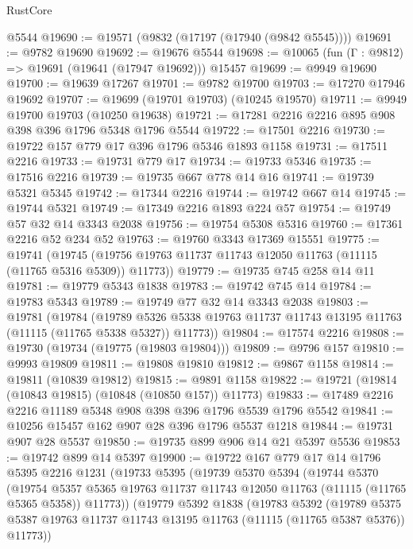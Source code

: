 \begin{lexlean}{RustCore}
\begin{coremodule}
    @5544
@19690 := @19571 (@9832 (@17197 (@17940 (@9842 @5545))))
@19691 := @9782 @19690
@19692 := @19676 @5544
@19698 := @10065 (fun (Γ : @9812) => @19691 (@19641 (@17947 @19692))) @15457
@19699 := @9949 @19690
@19700 := @19639 @17267
@19701 := @9782 @19700
@19703 := @17270 @17946 @19692
@19707 := @19699 (@19701 @19703) (@10245 @19570)
@19711 := @9949 @19700 @19703 (@10250 @19638)
@19721 := @17281 @2216 @2216 @895 @908 @398 @396 @1796 @5348 @1796 @5544
@19722 := @17501 @2216
@19730 := @19722 @157 @779 @17 @396 @1796 @5346 @1893 @1158
@19731 := @17511 @2216
@19733 := @19731 @779 @17
@19734 := @19733 @5346
@19735 := @17516 @2216
@19739 := @19735 @667 @778 @14 @16
@19741 := @19739 @5321 @5345
@19742 := @17344 @2216
@19744 := @19742 @667 @14
@19745 := @19744 @5321
@19749 := @17349 @2216 @1893 @224 @57
@19754 := @19749 @57 @32 @14 @3343 @2038
@19756 := @19754 @5308 @5316
@19760 := @17361 @2216 @52 @234 @52
@19763 := @19760 @3343 @17369 @15551
@19775 := @19741
    (@19745 (@19756 @19763 @11737 @11743 @12050 @11763 (@11115 (@11765 @5316 @5309)) @11773))
@19779 := @19735 @745 @258 @14 @11
@19781 := @19779 @5343 @1838
@19783 := @19742 @745 @14
@19784 := @19783 @5343
@19789 := @19749 @77 @32 @14 @3343 @2038
@19803 := @19781
    (@19784
      (@19789 @5326 @5338 @19763 @11737 @11743 @13195 @11763 (@11115 (@11765 @5338 @5327)) @11773))
@19804 := @17574 @2216
@19808 := @19730 (@19734 (@19775 (@19803 @19804)))
@19809 := @9796 @157
@19810 := @9993 @19809
@19811 := @19808 @19810
@19812 := @9867 @1158
@19814 := @19811 (@10839 @19812)
@19815 := @9891 @1158
@19822 := @19721 (@19814 (@10843 @19815) (@10848 (@10850 @157)) @11773)
@19833 := @17489 @2216 @2216 @11189 @5348 @908 @398 @396 @1796 @5539 @1796 @5542
@19841 := @10256 @15457 @162 @907 @28 @396 @1796 @5537 @1218
@19844 := @19731 @907 @28 @5537
@19850 := @19735 @899 @906 @14 @21 @5397 @5536
@19853 := @19742 @899 @14 @5397
@19900 := @19722
    @167
    @779
    @17
    @14
    @1796
    @5395
    @2216
    @1231
    (@19733
      @5395
      (@19739
        @5370
        @5394
        (@19744
          @5370
          (@19754
            @5357
            @5365
            @19763
            @11737
            @11743
            @12050
            @11763
            (@11115 (@11765 @5365 @5358))
            @11773))
        (@19779
          @5392
          @1838
          (@19783
            @5392
            (@19789
              @5375
              @5387
              @19763
              @11737
              @11743
              @13195
              @11763
              (@11115 (@11765 @5387 @5376))
              @11773))

\end{coremodule}
\end{lexlean}

